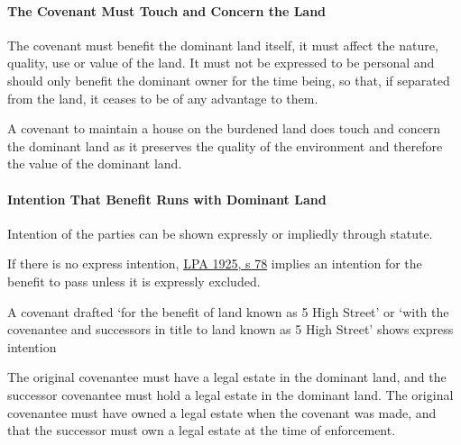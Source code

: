 \documentclass[
]{article}
\newenvironment{Shaded}{}{}
\newcommand{\NormalTok}[1]{#1}
\begin{document}
\hypertarget{the-covenant-must-touch-and-concern-the-land}{%
\paragraph{The Covenant Must Touch and Concern the
Land}\label{the-covenant-must-touch-and-concern-the-land}}

The covenant must benefit the dominant land itself, it must affect the
nature, quality, use or value of the land. It must not be expressed to
be personal and should only benefit the dominant owner for the time
being, so that, if separated from the land, it ceases to be of any
advantage to them.

\begin{Shaded}
\begin{Highlighting}[]
\NormalTok{A covenant to maintain a house on the burdened land does touch and concern the dominant land as it preserves the quality of the environment and therefore the value of the dominant land.}
\end{Highlighting}
\end{Shaded}

\hypertarget{intention-that-benefit-runs-with-dominant-land}{%
\paragraph{Intention That Benefit Runs with Dominant
Land}\label{intention-that-benefit-runs-with-dominant-land}}

Intention of the parties can be shown expressly or impliedly through
statute.

If there is no express intention,
\href{https://www.legislation.gov.uk/ukpga/Geo5/15-16/20/section/78}{LPA
1925, s 78} implies an intention for the benefit to pass unless it is
expressly excluded.

\begin{Shaded}
\begin{Highlighting}[]
\NormalTok{A covenant drafted ‘for the benefit of land known as 5 High Street’ or ‘with the covenantee and successors in title to land known as 5 High Street’ shows express intention}
\end{Highlighting}
\end{Shaded}

The original covenantee must have a legal estate in the dominant land,
and the successor covenantee must hold a legal estate in the dominant
land. The original covenantee must have owned a legal estate when the
covenant was made, and that the successor must own a legal estate at the
time of enforcement.
\end{document}

